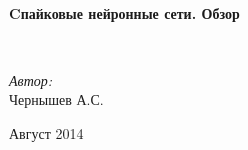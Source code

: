 \begin{titlepage}
\begin{center}
\HRule \\[0.4cm]
{ \huge \bfseries Cпайковые нейронные сети. Обзор \\[0.4cm] }

\HRule \\[1.5cm]

\begin{flushleft}
\emph{Автор:} \\
Чернышев А.С.
\end{flushleft}

\vfill

{\large Август 2014}

\end{center}
\end{titlepage}
